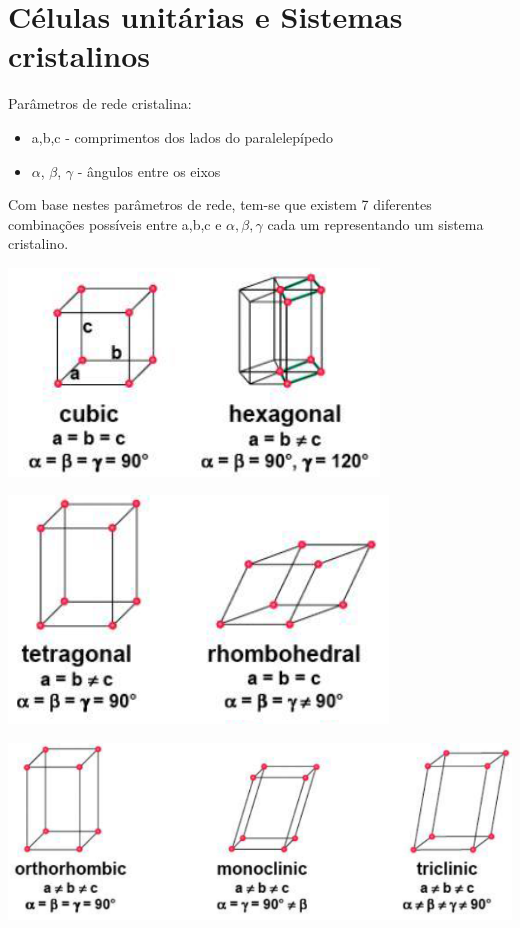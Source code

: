 \section{Células unitárias e Sistemas cristalinos}

Parâmetros de rede cristalina:
\begin{itemize}
	\setlength{\parskip}{0pt}
	\setlength{\itemsep}{0pt plus 1pt}
	
	\item a,b,c - comprimentos dos lados do paralelepípedo
	\item $ \alpha$, $\beta$, $\gamma $ - ângulos entre os eixos
\end{itemize}




Com base nestes parâmetros de rede, tem-se que existem 7 diferentes combinações possíveis entre a,b,c e $\alpha, \beta, \gamma $ cada um representando um sistema cristalino.


\includegraphics[scale=0.5,trim={0 0 0 0}]{figures/crist1}

\includegraphics[scale=0.5,trim={0 0 0 0}]{figures/crist2}

\includegraphics[scale=0.3,trim={0 0 0 0}]{figures/crist3}


